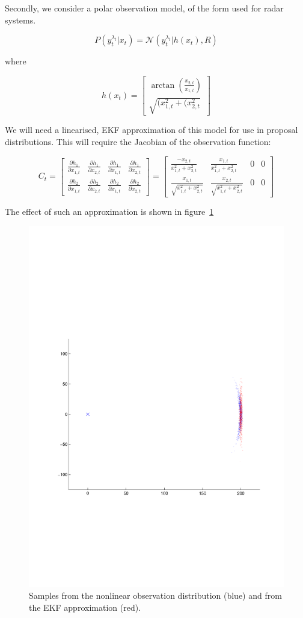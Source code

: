 Secondly, we consider a polar observation model, of the form used for radar systems.

\begin{equation}
P(y_t^{\lambda_t}|x_t) = \mathcal{N}(y_t^{\lambda_t}|h(x_t), R)
\label{eq:}
\end{equation}

where

\begin{equation}
h(x_t) = \begin{bmatrix}
\arctan \left( \frac{x_{2,t}}{x_{1,t}} \right)\\
\sqrt{ (x_{1,t}^2 + (x_{2,t}^2 }
\end{bmatrix}
\label{eq:}
\end{equation}

We will need a linearised, EKF approximation of this model for use in proposal distributions. This will require the Jacobian of the observation function:

\begin{equation}
C_t = \begin{bmatrix} \frac{\partial h_1}{\partial x_{1,t}} & \frac{\partial h_1}{\partial x_{2,t}} & \frac{\partial h_1}{\partial \dot{x}_{1,t}} & \frac{\partial h_1}{\partial \dot{x}_{2,t}} \\ \frac{\partial h_2}{\partial x_{1,t}} & \frac{\partial h_2}{\partial x_{2,t}} & \frac{\partial h_2}{\partial \dot{x}_{1,t}} & \frac{\partial h_2}{\partial \dot{x}_{2,t}} \end{bmatrix}
= \begin{bmatrix} \frac{-x_{2,t}}{x_{1,t}^2 + x_{2,t}^2} & \frac{x_{1,t}}{x_{1,t}^2 + x_{2,t}^2} & 0 & 0 \\ \frac{x_{1,t}}{\sqrt{x_{1,t}^2 + x_{2,t}^2}} & \frac{x_{2,t}}{\sqrt{x_{1,t}^2 + x_{2,t}^2}} & 0 & 0 \end{bmatrix}
\label{eq:}
\end{equation}

The effect of such an approximation is shown in figure~\ref{fig:EKFradar}

\begin{figure}[!hbt] \centering
\includegraphics[width=0.7\columnwidth]{EKF.pdf}%
\caption{Samples from the nonlinear observation distribution (blue) and from the EKF approximation (red).}%
\label{fig:EKFradar}%
\end{figure}
